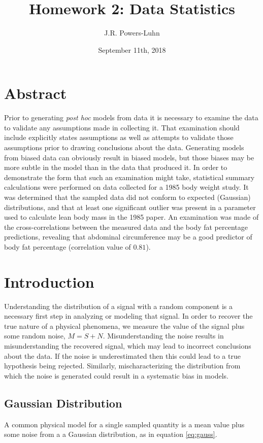 \documentclass{IEEEtran}
\author{J.R. Powers-Luhn}
\title{Homework 2: Data Statistics}
\date{September 11th, 2018}
\begin{document}
\maketitle

\section{Abstract}
Prior to generating \textit{post hoc} models from data it is necessary to examine the data to validate any assumptions made in collecting it. That examination should include explicitly states assumptions as well as attempts to validate those assumptions prior to drawing conclusions about the data. Generating models from biased data can obviously result in biased models, but those biases may be more subtle in the model than in the data that produced it. In order to demonstrate the form that such an examination might take, statistical summary calculations were performed on data collected for a 1985 body weight study. It was determined that the sampled data did not conform to expected (Gaussian) distributions, and that at least one significant outlier was present in a parameter used to calculate lean body mass in the 1985 paper. An examination was made of the cross-correlations between the measured data and the body fat percentage predictions, revealing that abdominal circumference may be a good predictor of body fat percentage (correlation value of $0.81$). 

\section{Introduction}
Understanding the distribution of a signal with a random component is a necessary first step in analyzing or modeling that signal. In order to recover the true nature of a physical phenomena, we measure the value of the signal plus some random noise, $M = S + N$. Misunderstanding the noise results in misunderstanding the recovered signal, which may lead to incorrect conclusions about the data. If the noise is underestimated then this could lead to a true hypothesis being rejected. Similarly, mischaracterizing the distribution from which the noise is generated could result in a systematic bias in models. 

\subsection{Gaussian Distribution}
A common physical model for a single sampled quantity is a mean value plus some noise from a a Gaussian distribution, as in equation \ref{eq:gauss}.
\end{document}
